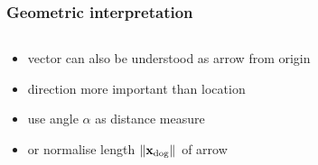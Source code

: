 \documentclass[t]{beamer} %
\begin{document}
\begin{frame}
  \frametitle{Geometric interpretation}

  \begin{columns}[T]
    \begin{column}{40mm}
      \begin{itemize}
      \item vector can also be understood as arrow from origin
      \item direction more important than location
      \item<beamer:1-| handout:1-> use angle $\alpha$ as distance measure
      \item<beamer:2-| handout:2-> or normalise length $\norm{\vx_{\text{dog}}}$ of arrow
      \end{itemize}
    \end{column}
    \begin{column}{75mm}
      \ungap[1]
    \end{column}
  \end{columns}
\end{frame}
\end{document}
